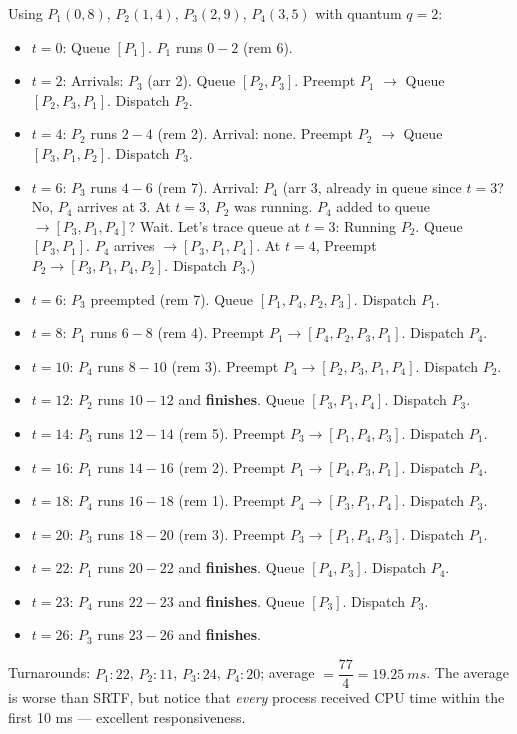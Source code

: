 \documentclass[11pt]{article}
\begin{document}
\begin{exemplebox}[Round Robin with $q = 2$ on the Same Processes]
Using $P_1(0,8)$, $P_2(1,4)$, $P_3(2,9)$, $P_4(3,5)$ with quantum $q=2$:
\begin{itemize}
\item $t=0$: Queue $[P_1]$. $P_1$ runs $0\!-\!2$ (rem 6).
\item $t=2$: Arrivals: $P_3$ (arr 2). Queue $[P_2, P_3]$. Preempt $P_1$ $\to$ Queue $[P_2, P_3, P_1]$. Dispatch $P_2$.
\item $t=4$: $P_2$ runs $2\!-\!4$ (rem 2). Arrival: none. Preempt $P_2$ $\to$ Queue $[P_3, P_1, P_2]$. Dispatch $P_3$.
\item $t=6$: $P_3$ runs $4\!-\!6$ (rem 7). Arrival: $P_4$ (arr 3, already in queue since $t=3$? No, $P_4$ arrives at 3. At $t=3$, $P_2$ was running. $P_4$ added to queue $\to [P_3, P_1, P_4]$? Wait. Let's trace queue at $t=3$: Running $P_2$. Queue $[P_3, P_1]$. $P_4$ arrives $\to [P_3, P_1, P_4]$. At $t=4$, Preempt $P_2 \to [P_3, P_1, P_4, P_2]$. Dispatch $P_3$.)
\item $t=6$: $P_3$ preempted (rem 7). Queue $[P_1, P_4, P_2, P_3]$. Dispatch $P_1$.
\item $t=8$: $P_1$ runs $6\!-\!8$ (rem 4). Preempt $P_1 \to [P_4, P_2, P_3, P_1]$. Dispatch $P_4$.
\item $t=10$: $P_4$ runs $8\!-\!10$ (rem 3). Preempt $P_4 \to [P_2, P_3, P_1, P_4]$. Dispatch $P_2$.
\item $t=12$: $P_2$ runs $10\!-\!12$ and \textbf{finishes}. Queue $[P_3, P_1, P_4]$. Dispatch $P_3$.
\item $t=14$: $P_3$ runs $12\!-\!14$ (rem 5). Preempt $P_3 \to [P_1, P_4, P_3]$. Dispatch $P_1$.
\item $t=16$: $P_1$ runs $14\!-\!16$ (rem 2). Preempt $P_1 \to [P_4, P_3, P_1]$. Dispatch $P_4$.
\item $t=18$: $P_4$ runs $16\!-\!18$ (rem 1). Preempt $P_4 \to [P_3, P_1, P_4]$. Dispatch $P_3$.
\item $t=20$: $P_3$ runs $18\!-\!20$ (rem 3). Preempt $P_3 \to [P_1, P_4, P_3]$. Dispatch $P_1$.
\item $t=22$: $P_1$ runs $20\!-\!22$ and \textbf{finishes}. Queue $[P_4, P_3]$. Dispatch $P_4$.
\item $t=23$: $P_4$ runs $22\!-\!23$ and \textbf{finishes}. Queue $[P_3]$. Dispatch $P_3$.
\item $t=26$: $P_3$ runs $23\!-\!26$ and \textbf{finishes}.
\end{itemize}
Turnarounds: $P_1: 22$, $P_2: 11$, $P_3: 24$, $P_4: 20$; average $= \dfrac{77}{4} = \SI{19.25}{ms}$. The average is worse than SRTF, but notice that \emph{every} process received CPU time within the first 10 ms --- excellent responsiveness.
\end{exemplebox}
\end{document}
